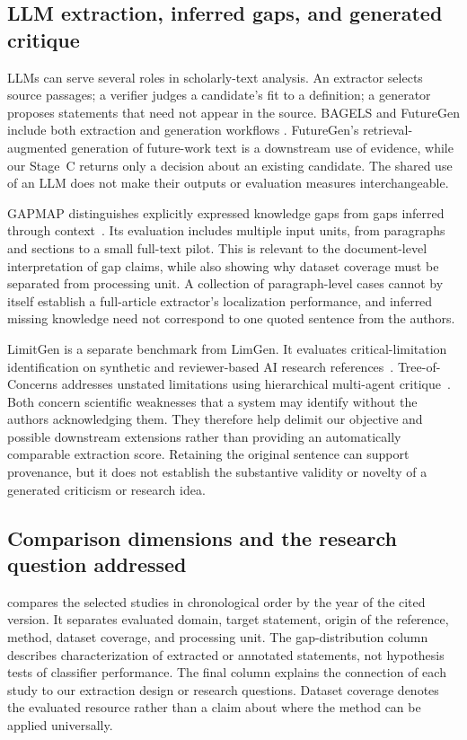 \subsection{LLM extraction, inferred gaps, and generated critique}
\label{S:rw-methods}

LLMs can serve several roles in scholarly-text analysis. An extractor selects source passages;
a verifier judges a candidate's fit to a definition; a generator proposes statements that need not
appear in the source. BAGELS and FutureGen include both extraction and generation workflows
\citep{alazher2025bagels,alazher2025futuregen}. FutureGen's retrieval-augmented generation of
future-work text is a downstream use of evidence, while our Stage~C returns only a decision about
an existing candidate. The shared use of an LLM does not make their outputs or evaluation measures
interchangeable.

GAPMAP distinguishes explicitly expressed knowledge gaps from gaps inferred through
context~\citep{salem2025gapmap}. Its evaluation includes multiple input units, from paragraphs
and sections to a small full-text pilot. This is relevant to the document-level interpretation
of gap claims, while also showing why dataset coverage must be separated from processing unit.
A collection of paragraph-level cases cannot by itself establish a full-article extractor's
localization performance, and inferred missing knowledge need not correspond to one quoted
sentence from the authors.

LimitGen is a separate benchmark from LimGen. It evaluates critical-limitation identification on
synthetic and reviewer-based AI research references~\citep{xu2025llms}. Tree-of-Concerns addresses
unstated limitations using hierarchical multi-agent critique~\citep{mishra2026tree}.
Both concern scientific weaknesses that a system may identify without the authors acknowledging
them. They therefore help delimit our objective and possible downstream extensions rather than
providing an automatically comparable extraction score. Retaining the original sentence can
support provenance, but it does not establish the substantive validity or novelty of a generated
criticism or research idea.

\subsection{Comparison dimensions and the research question addressed}
\label{S:rw-gap}

 compares the selected studies in chronological order by the
year of the cited version. It separates evaluated domain, target statement, origin of the reference,
method, dataset coverage, and processing unit. The gap-distribution column describes characterization
of extracted or annotated statements, not hypothesis tests of classifier performance. The final
column explains the connection of each study to our extraction design or research questions.
Dataset coverage denotes the evaluated resource rather than a claim about where the method can
be applied universally.

